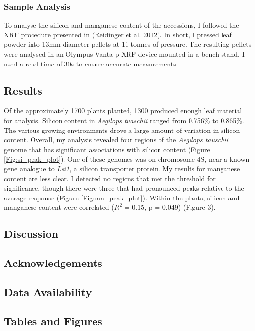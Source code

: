 \documentclass[12pt, letterpaper, ]{article}
\begin{document}
\subsubsection{Sample Analysis}
To analyse the silicon and manganese content of the accessions, I followed the XRF procedure presented in (Reidinger et al. 2012). In short, I pressed leaf powder into 13mm diameter pellets at 11 tonnes of pressure. The resulting pellets were analysed in an Olympus Vanta p-XRF device mounted in a bench stand. I used a read time of 30s to ensure accurate measurements. 

\subsection{Results}

Of the approximately 1700 plants planted, 1300 produced enough leaf material for analysis. Silicon content in \textit{Aegilops tuaschii} ranged from 0.756\% to 0.865\%. The various growing environments drove a large amount of variation in silicon content. Overall, my analysis revealed four regions of the \textit{Aegilops tauschii} genome that has significant associations with silicon content (Figure \ref{Fig:si_peak_plot}). One of these genomes was on chromosome 4S, near a known gene analogue to \textit{Lsi1}, a silicon transporter protein. My results for manganese content are less clear. I detected no regions that met the threshold for significance, though there were three that had pronounced peaks relative to the average response (Figure \ref{Fig:mn_peak_plot}). Within the plants, silicon and manganese content were correlated ($R^2$ = 0.15, p = 0.049) (Figure 3). 

\subsection{Discussion}

\subsection{Acknowledgements}

\subsection{Data Availability}

\subsection{Tables and Figures}
\end{document}
